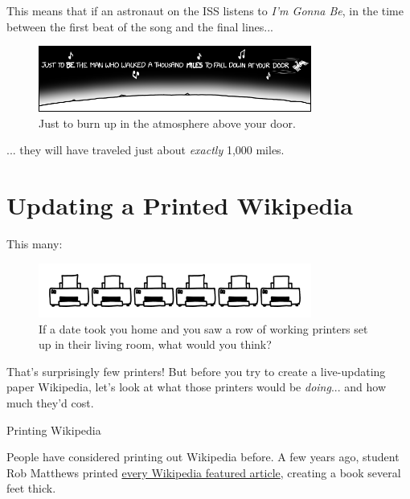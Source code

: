 {{This means that if an astronaut on the ISS listens to \emph{I'm Gonna Be}, in the time between the first beat of the song and the final lines...}

\begin{figure}[!htbp]
\centering
\includegraphics[scale=0.5, max width=0.8\textwidth]{imgs/a/58/orbit_1000.png}
\caption{Just to burn up in the atmosphere above your door.}
\end{figure}

{... they will have traveled just about \emph{exactly} 1,000 miles.}

{
\chapter{Updating a Printed Wikipedia}
}

\hfill{}

{This many:}

\begin{figure}[!htbp]
\centering
\includegraphics[scale=0.5, max width=0.8\textwidth]{imgs/a/59/wiki_count.png}
\caption{If a date took you home and you saw a row of working printers set up in their living room, what would you think?}
\end{figure}

{That's surprisingly few printers! But before you try to create a live-updating paper Wikipedia, let's look at what those printers would be \emph{doing}... and how much they'd cost.}

{Printing Wikipedia}

{People have considered printing out Wikipedia before. A few years ago, student Rob Matthews printed \href{http://www.brandnew.uk.com/wikipedia-as-a-printed-book/}{every Wikipedia featured article}, creating a book several feet thick.}

}
